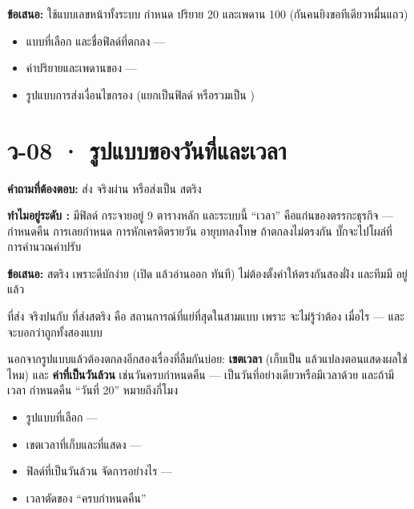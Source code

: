 \textbf{ข้อเสนอ:} ใช้แบบเลขหน้าทั้งระบบ กำหนด  ปริยาย 20
และเพดาน 100 (กันคนยิงขอทีเดียวหมื่นแถว)

\begin{outbox}
\begin{itemize}
\item แบบที่เลือก และชื่อฟิลด์ที่ตกลง ---
\item ค่าปริยายและเพดานของ  ---
\item รูปแบบการส่งเงื่อนไขกรอง (แยกเป็นฟิลด์ หรือรวมเป็น  )
\end{itemize}
\end{outbox}

\section{ว-08 · รูปแบบของวันที่และเวลา}

\textbf{คำถามที่ต้องตอบ:} ส่ง  จริงผ่าน  หรือส่งเป็น
สตริง 

\textbf{ทำไมอยู่ระดับ \pone{}:}  มีฟิลด์ 
กระจายอยู่ 9 ตารางหลัก และระบบนี้ ``เวลา'' คือแก่นของตรรกะธุรกิจ --- กำหนดคืน
การเลยกำหนด การหักเครดิตรายวัน อายุบทลงโทษ ถ้าตกลงไม่ตรงกัน บั๊กจะไปโผล่ที่
การคำนวณค่าปรับ

\textbf{ข้อเสนอ:} สตริง  เพราะดีบักง่าย (เปิด  แล้วอ่านออก
ทันที) ไม่ต้องตั้งค่าให้ตรงกันสองฝั่ง และทีมมี  อยู่แล้ว

\begin{warnbox}[title={สิ่งที่สำคัญกว่าการเลือกแบบไหน คือห้ามมีข้อยกเว้น}]
 ที่ส่ง  จริงปนกับ  ที่ส่งสตริง คือ
สถานการณ์ที่แย่ที่สุดในสามแบบ เพราะ  จะไม่รู้ว่าต้อง 
เมื่อไร --- และ  จะบอกว่าถูกทั้งสองแบบ
\end{warnbox}

นอกจากรูปแบบแล้วต้องตกลงอีกสองเรื่องที่ลืมกันบ่อย: \textbf{เขตเวลา}
(เก็บเป็น  แล้วแปลงตอนแสดงผลใช่ไหม) และ \textbf{ค่าที่เป็นวันล้วน}
เช่นวันครบกำหนดคืน --- เป็นวันที่อย่างเดียวหรือมีเวลาด้วย และถ้ามีเวลา
กำหนดคืน ``วันที่ 20'' หมายถึงกี่โมง

\begin{outbox}
\begin{itemize}
\item รูปแบบที่เลือก ---
\item เขตเวลาที่เก็บและที่แสดง ---
\item ฟิลด์ที่เป็นวันล้วน จัดการอย่างไร ---
\item เวลาตัดของ ``ครบกำหนดคืน''
\end{itemize}
\end{outbox}

